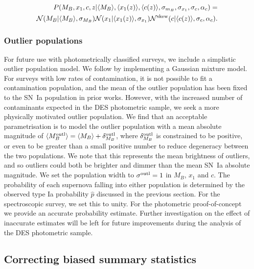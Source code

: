 \documentclass[a4paper,fleqn,usenatbib]{emulateapj}
\newcommand{\rubin}{\citetalias{Rubin2015}}
\begin{document}
\begin{align}
P(M_B, x_1, c, z | \langle M_B \rangle, \langle x_1(z) \rangle, \langle c(z) \rangle, \sigma_{m_B}, \sigma_{x_1}, \sigma_c, \alpha_c) = \notag \\
\mathcal{N}(M_B|\langle M_B \rangle, \sigma_{M_B}) \mathcal{N}(x_1 | \langle x_1(z) \rangle, \sigma_{x_1}) \mathcal{N}^{\rm{skew}}(c| \langle c(z) \rangle, \sigma_c, \alpha_c) \label{eq:l1}.
\end{align}

\subsubsection{Outlier populations}

For future use with photometrically classified surveys, we include a simplistic outlier population model. We follow {\rubin} \citep[and therefore ][]{Kunz2007} by implementing a Gaussian mixture model. For surveys with low rates of contamination, it is not possible to fit a contamination population, and the mean of the outlier population has been fixed to the SN~Ia population in prior works. However, with the increased number of contaminants expected in the DES photometric sample, we seek a more physically motivated outlier population.  We find that an acceptable parametrisation is to model the outlier population with a mean absolute magnitude of $\langle M_B^{\rm outl} \rangle = \langle M_B \rangle + \delta_{M_B}^{\rm outl}$, where $\delta_{M_B}^{\rm outl}$ is constrained to be positive, or even to be greater than a small positive number to reduce degeneracy between the two populations.  We note that this represents the mean brightness of outliers, and so outliers could both be brighter and dimmer than the mean SN~Ia absolute magnitude. We set the population width to $\sigma^{\rm outl} = 1$ in $M_B$, $x_1$ and $c$. The probability of each supernova falling into either population is determined by the observed type Ia probability $\hat{p}$ discussed in the previous section. For the spectroscopic survey, we set this to unity. For the photometric proof-of-concept we provide an accurate probability estimate. Further investigation on the effect of inaccurate estimates will be left for future improvements during the analysis of the DES photometric sample.


\subsection{Correcting biased summary statistics}
\end{document}

